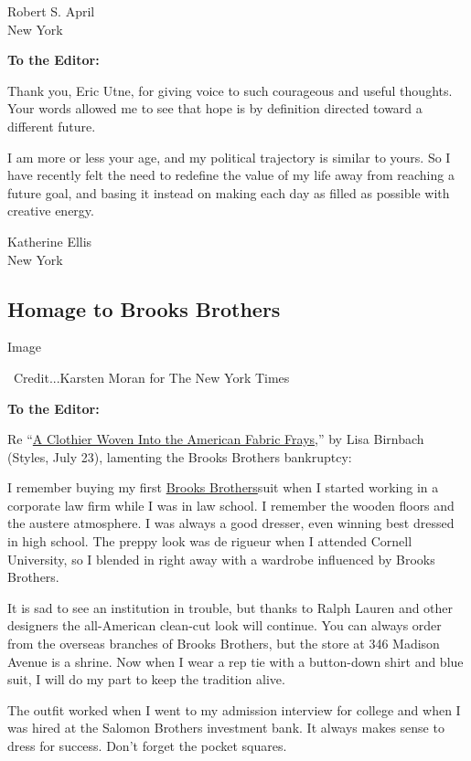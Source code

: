 Robert S. April\\
New York

\textbf{To the Editor:}

Thank you, Eric Utne, for giving voice to such courageous and useful
thoughts. Your words allowed me to see that hope is by definition
directed toward a different future.

I am more or less your age, and my political trajectory is similar to
yours. So I have recently felt the need to redefine the value of my life
away from reaching a future goal, and basing it instead on making each
day as filled as possible with creative energy.

Katherine Ellis\\
New York

\hypertarget{homage-to-brooks-brothers}{%
\subsection{Homage to Brooks Brothers}\label{homage-to-brooks-brothers}}

Image

~Credit...Karsten Moran for The New York Times

\textbf{To the Editor:}

Re
``\href{https://www.nytimes3xbfgragh.onion/2020/07/22/style/brooks-brothers-bankruptcy-lisa-birnbach-preppy-handbook.html}{A
Clothier Woven Into the American Fabric Frays},'' by Lisa Birnbach
(Styles, July 23), lamenting the Brooks Brothers bankruptcy:

I remember buying my first
\href{https://www.nytimes3xbfgragh.onion/2020/06/05/business/brooks-brothers-factory-closings.html}{Brooks
Brothers}suit when I started working in a corporate law firm while I was
in law school. I remember the wooden floors and the austere atmosphere.
I was always a good dresser, even winning best dressed in high school.
The preppy look was de rigueur when I attended Cornell University, so I
blended in right away with a wardrobe influenced by Brooks Brothers.

It is sad to see an institution in trouble, but thanks to Ralph Lauren
and other designers the all-American clean-cut look will continue. You
can always order from the overseas branches of Brooks Brothers, but the
store at 346 Madison Avenue is a shrine. Now when I wear a rep tie with
a button-down shirt and blue suit, I will do my part to keep the
tradition alive.

The outfit worked when I went to my admission interview for college and
when I was hired at the Salomon Brothers investment bank. It always
makes sense to dress for success. Don't forget the pocket squares.

